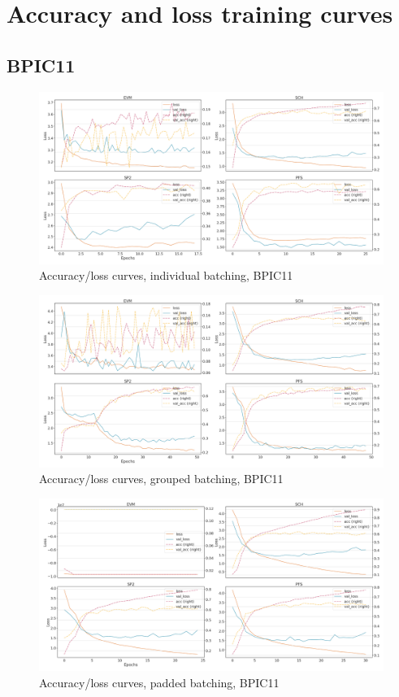 \chapter{Accuracy and loss training curves}
\label{appendix:loss-curves}

\section*{BPIC11}
\begin{figure}[!htb]
    \centering
    \includegraphics[width=\textwidth]{gfx/bpic2011/individual_loss_acc_curve.png}
    \caption{Accuracy/loss curves, individual batching, BPIC11}
\end{figure}
\begin{figure}[!htb]
    \centering
    \includegraphics[width=\textwidth]{gfx/bpic2011/grouped_loss_acc_curve.png}
    \caption{Accuracy/loss curves, grouped batching, BPIC11}
\end{figure}
\begin{figure}[!htb]
    \centering
    \includegraphics[width=\textwidth]{gfx/bpic2011/padded_loss_acc_curve.png}
    \caption{Accuracy/loss curves, padded batching, BPIC11}
\end{figure}
